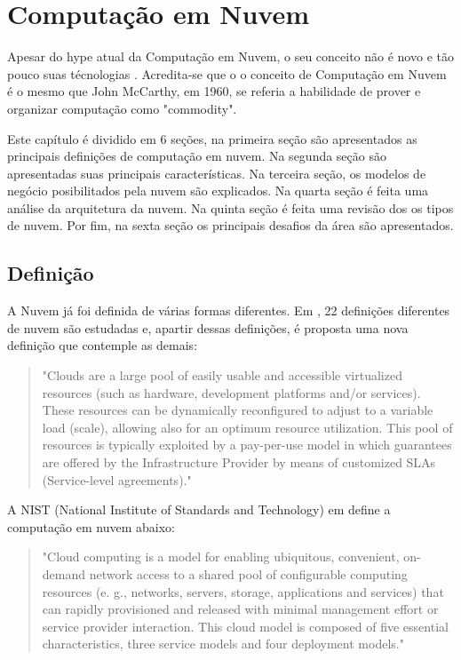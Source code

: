 \chapter{Computação em Nuvem}
Apesar do hype  atual da Computação em Nuvem,
o seu conceito não é novo e tão pouco suas técnologias
\cite{CloudUncovered:2012}. Acredita-se que o o conceito de Computação em
Nuvem é o mesmo que John McCarthy, em 1960, se referia a habilidade de prover
e organizar computação como "commodity". 

Este capítulo é dividido em 6 seções, na primeira seção são apresentados as principais definições de computação em nuvem. Na segunda seção são apresentadas suas principais características. Na terceira seção, os modelos de negócio posibilitados pela nuvem são explicados. Na quarta seção é feita uma análise da arquitetura da nuvem. Na quinta seção é feita uma revisão dos os tipos de nuvem. Por fim, na sexta seção os principais desafios da área são apresentados. 


\section{Definição}
	A Nuvem já foi definida de várias formas diferentes. Em \cite{CloudDefinition:2009}, 22  definições diferentes de nuvem são estudadas e, apartir dessas definições, é proposta uma nova definição que contemple as demais:
	
	\begin{quotation}
		"Clouds are a large pool of easily usable and accessible virtualized resources (such as hardware, development platforms and/or services). These resources can be dynamically reconfigured to adjust to a variable load (scale), allowing also for an optimum resource utilization. This pool of resources is typically exploited by a pay-per-use model in which guarantees are offered by the Infrastructure Provider by means of customized SLAs (Service-level agreements)."
	\end{quotation}
	
	A NIST (National Institute of Standards and Technology) em \cite{NIST:2011} define a computação em nuvem abaixo:
	
	\begin{quotation}
		"Cloud computing is a model for enabling ubiquitous, convenient, on-demand network access to a shared pool of configurable computing resources (e. g., networks, servers, storage, applications and services) that can rapidly provisioned and released with minimal management effort or service provider interaction. This cloud model is composed of five essential characteristics, three service models and four deployment models."
	\end{quotation}	
	
